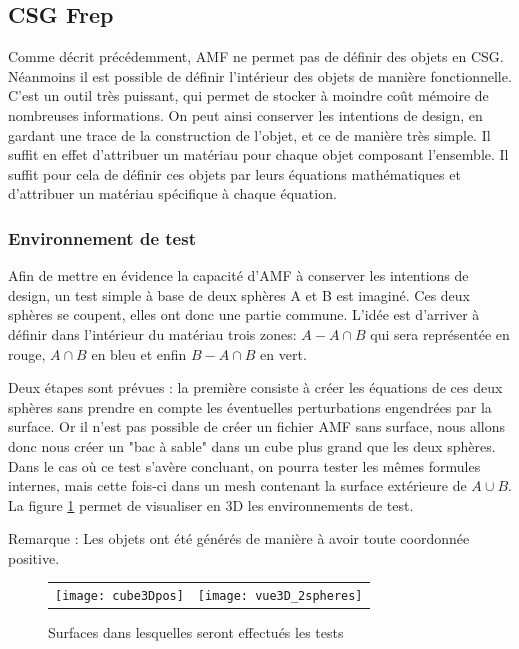 \documentclass{tnreport}
\begin{document}
\subsection{CSG Frep}
Comme décrit précédemment, AMF ne permet pas de définir des objets en CSG. Néanmoins il est possible de définir l'intérieur des objets de manière fonctionnelle. C'est un outil très puissant, qui permet de stocker à moindre coût mémoire de nombreuses informations. On peut ainsi conserver les intentions de design, en gardant une trace de la construction de l'objet, et ce de manière très simple. Il suffit en effet d'attribuer un matériau pour chaque objet composant l'ensemble. Il suffit pour cela de définir ces objets par leurs équations mathématiques et d'attribuer un matériau spécifique à chaque équation. 
\subsubsection{Environnement de test}
Afin de mettre en évidence la capacité d'AMF à conserver les intentions de design, un test simple à base de deux sphères A et B est imaginé. Ces deux sphères se coupent, elles ont donc une partie commune. L'idée est d'arriver à définir dans l'intérieur du matériau trois zones: $A-A \cap B$ qui sera représentée en rouge, $A \cap B$ en bleu et enfin $B-A \cap B$ en vert. 

Deux étapes sont prévues : la première consiste à créer les équations de ces deux sphères sans prendre en compte les éventuelles perturbations engendrées par la surface. Or il n'est pas possible de créer un fichier AMF sans surface, nous allons donc nous créer un "bac à sable" dans un cube plus grand que les deux sphères. Dans le cas où ce test s'avère concluant, on pourra tester les mêmes formules internes, mais cette fois-ci dans un mesh contenant la surface extérieure de $A \cup B$. La figure \ref{fig:envconvdesign} permet de visualiser en 3D les environnements de test.

Remarque : Les objets ont été générés de manière à avoir toute coordonnée positive. 
\begin{figure}[htb]
\centering
  \begin{tabular}{@{}cc@{}}
    \texttt{[image: cube3Dpos]} &
    \texttt{[image: vue3D\_2spheres]}
  \end{tabular}
  \caption{Surfaces dans lesquelles seront effectués les tests}
  \label{fig:envconvdesign}
\end{figure}
\end{document}
